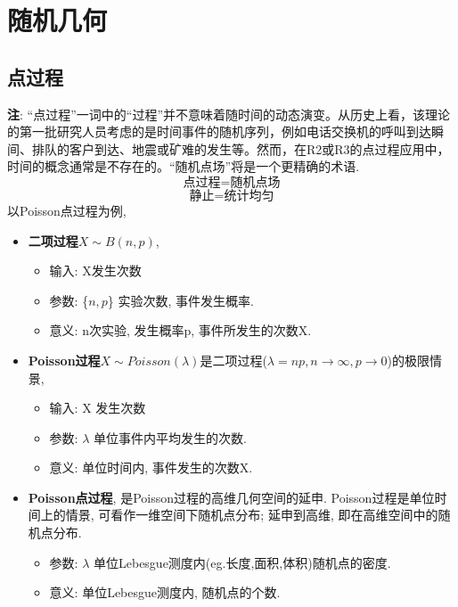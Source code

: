 \documentclass{article}
\title{}\date{} \setlength{\parindent}{0pt} \linespread{1.25}
\begin{document}
\tableofcontents

\section{随机几何}
    \subsection{点过程}
        \textbf{注}: “点过程”一词中的“过程”并不意味着随时间的动态演变。从历史上看，该理论的第一批研究人员考虑的是时间事件的随机序列，例如电话交换机的呼叫到达瞬间、排队的客户到达、地震或矿难的发生等。然而，在R2或R3的点过程应用中，时间的概念通常是不存在的。“随机点场”将是一个更精确的术语.
        $$\text{点过程} = \text{随机点场}$$
        $$\text{静止} = \text{统计均匀}$$
        以Poisson点过程为例,
        \begin{itemize}
        \item \textbf{二项过程}$X \sim B(n,p)$, 
            \begin{itemize}
                \item 输入: X发生次数
                \item 参数: \{$n, p$\} 实验次数, 事件发生概率.
                \item 意义: n次实验, 发生概率p, 事件所发生的次数X.
            \end{itemize}
            
        \item \textbf{Poisson过程}$X \sim Poisson(\lambda)$是二项过程($\lambda = np , n \to \infty, p \to 0$)的极限情景,
            \begin{itemize}
                \item 输入: X 发生次数
                \item 参数: $\lambda$ 单位事件内平均发生的次数.
                \item 意义: 单位时间内, 事件发生的次数X.
            \end{itemize}
            
        \item \textbf{Poisson点过程}, 是Poisson过程的高维几何空间的延申. Poisson过程是单位时间上的情景, 可看作一维空间下随机点分布; 延申到高维, 即在高维空间中的随机点分布.
            \begin{itemize}
                \item 参数: $\lambda$ 单位Lebesgue测度内(eg.长度,面积,体积)随机点的密度.
                \item 意义: 单位Lebesgue测度内, 随机点的个数.
            \end{itemize}
        \end{itemize}
        
\end{document}
